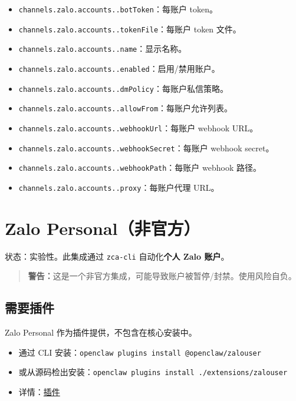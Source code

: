 \begin{itemize}
  \item \texttt{channels.zalo.accounts..botToken}：每账户 token。
  \item \texttt{channels.zalo.accounts..tokenFile}：每账户 token 文件。
  \item \texttt{channels.zalo.accounts..name}：显示名称。
  \item \texttt{channels.zalo.accounts..enabled}：启用/禁用账户。
  \item \texttt{channels.zalo.accounts..dmPolicy}：每账户私信策略。
  \item \texttt{channels.zalo.accounts..allowFrom}：每账户允许列表。
  \item \texttt{channels.zalo.accounts..webhookUrl}：每账户 webhook URL。
  \item \texttt{channels.zalo.accounts..webhookSecret}：每账户 webhook secret。
  \item \texttt{channels.zalo.accounts..webhookPath}：每账户 webhook 路径。
  \item \texttt{channels.zalo.accounts..proxy}：每账户代理 URL。
\end{itemize}



\clearpage

\section{Zalo Personal（非官方）}


状态：实验性。此集成通过 \texttt{zca-cli} 自动化\textbf{个人 Zalo 账户}。

\begin{quote}
\textbf{警告：}这是一个非官方集成，可能导致账户被暂停/封禁。使用风险自负。
\end{quote}


\subsection{需要插件}


Zalo Personal 作为插件提供，不包含在核心安装中。

\begin{itemize}
  \item 通过 CLI 安装：\texttt{openclaw plugins install @openclaw/zalouser}
  \item 或从源码检出安装：\texttt{openclaw plugins install ./extensions/zalouser}
  \item 详情：\href{/tools/plugin}{插件}
\end{itemize}


